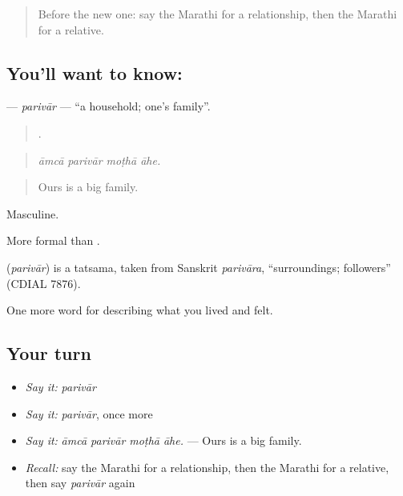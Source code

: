 \label{lesson:MR-C494-parivar}



\begin{quote}
Before the new one: say the Marathi for a relationship, then the Marathi for a relative.
\end{quote}

\subsection*{You'll want to know: }
\textbf{} — \emph{parivār} — \textquotedblleft{}a household; one's family\textquotedblright{}.

\begin{quote}
   .
\end{quote}

\begin{quote}
\emph{āmcā parivār moṭhā āhe.}
\end{quote}

\begin{quote}
Ours is a big family.
\end{quote}

Masculine.

More formal than .

\begin{cousinweb}
\textbf{} (\emph{parivār}) is a tatsama, taken from Sanskrit \emph{parivāra}, \textquotedblleft{}surroundings; followers\textquotedblright{} (CDIAL 7876).
\end{cousinweb}

\begin{grammarlens}[title={What you've built}]
One more word for describing what you lived and felt.
\end{grammarlens}

\subsection*{Your turn}
\begin{itemize}
\raggedright
  \item \emph{Say it:} \emph{parivār}
  \item \emph{Say it:} \emph{parivār}, once more
  \item \emph{Say it:} \emph{āmcā parivār moṭhā āhe.} — Ours is a big family.
  \item \emph{Recall:} say the Marathi for a relationship, then the Marathi for a relative, then say \emph{parivār} again
\end{itemize}

